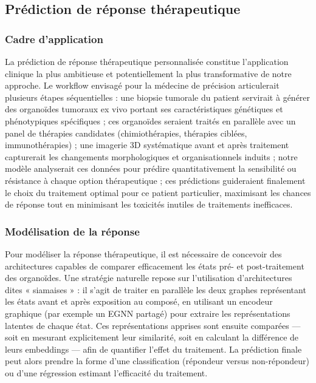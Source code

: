 \subsection{Prédiction de réponse thérapeutique}

\subsubsection{Cadre d'application}

La prédiction de réponse thérapeutique personnalisée constitue l'application clinique la plus ambitieuse et potentiellement la plus transformative de notre approche. Le workflow envisagé pour la médecine de précision articulerait plusieurs étapes séquentielles : une biopsie tumorale du patient servirait à générer des organoïdes tumoraux ex vivo portant ses caractéristiques génétiques et phénotypiques spécifiques ; ces organoïdes seraient traités en parallèle avec un panel de thérapies candidates (chimiothérapies, thérapies ciblées, immunothérapies) ; une imagerie 3D systématique avant et après traitement capturerait les changements morphologiques et organisationnels induits ; notre modèle analyserait ces données pour prédire quantitativement la sensibilité ou résistance à chaque option thérapeutique ; ces prédictions guideraient finalement le choix du traitement optimal pour ce patient particulier, maximisant les chances de réponse tout en minimisant les toxicités inutiles de traitements inefficaces.

\subsubsection{Modélisation de la réponse}

Pour modéliser la réponse thérapeutique, il est nécessaire de concevoir des architectures capables de comparer efficacement les états pré- et post-traitement des organoïdes. Une stratégie naturelle repose sur l’utilisation d’architectures dites « siamaises » : il s’agit de traiter en parallèle les deux graphes représentant les états avant et après exposition au composé, en utilisant un encodeur graphique (par exemple un EGNN partagé) pour extraire les représentations latentes de chaque état. Ces représentations apprises sont ensuite comparées — soit en mesurant explicitement leur similarité, soit en calculant la différence de leurs embeddings — afin de quantifier l’effet du traitement. La prédiction finale peut alors prendre la forme d’une classification (répondeur versus non-répondeur) ou d’une régression estimant l’efficacité du traitement.

